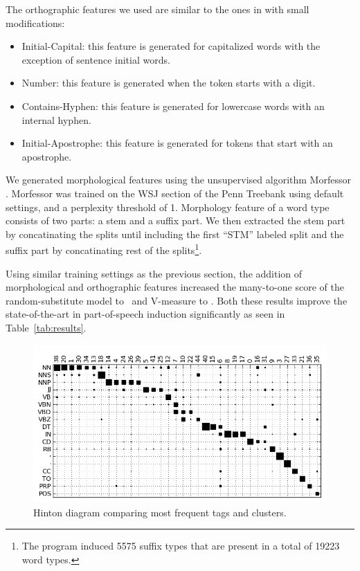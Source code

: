 The orthographic features we used are similar to the ones in
\cite{bergkirkpatrick-EtAl:2010:NAACLHLT} with small modifications:

\begin{itemize}
\item Initial-Capital: this feature is generated for capitalized words
  with the exception of sentence initial words.
\item Number: this feature is generated when the token starts with a
  digit.
\item Contains-Hyphen: this feature is generated for lowercase words
  with an internal hyphen.
\item Initial-Apostrophe: this feature is generated for tokens that
  start with an apostrophe.
\end{itemize}

We generated morphological features using the unsupervised algorithm
Morfessor \cite{creutz05}.  Morfessor was trained on the WSJ section
of the Penn Treebank using default settings, and a perplexity
threshold of 1.  Morphology feature of a word type consists of two
parts: a stem and a suffix part.  We then extracted the stem part by
concatinating the splits until including the first ``STM'' labeled
split and the suffix part by concatinating rest of the
splits\footnote{The program induced 5575 suffix types that are present
  in a total of 19223 word types.}.


Using similar training settings as the previous section, the addition
of morphological and orthographic features increased the many-to-one
score of the random-substitute model to \ftmto\ and V-measure to \ftvm.
Both these results improve the state-of-the-art in part-of-speech
induction significantly as seen in Table~\ref{tab:results}.

\begin{figure}[ht] \centering
\vspace*{-10mm}
\includegraphics[width=\textwidth]{hinton.png}
\caption{Hinton diagram comparing most frequent tags and clusters.}
\label{plot-hinton}
\end{figure}

